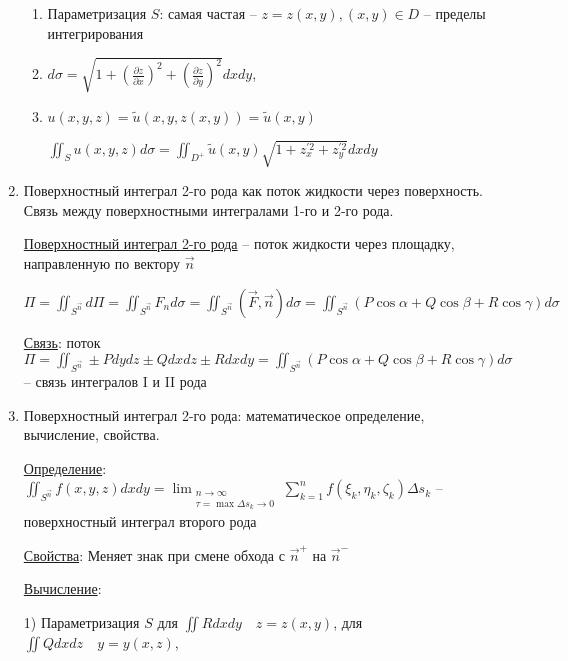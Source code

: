 \documentclass[12pt]{article}
\begin{document}
\begin{enumerate}
        \begin{enumerate}
            \item Параметризация $S$: самая частая -- $z = z(x, y), (x, y) \in D$ -- пределы интегрирования

            \item $d\sigma = \sqrt{1 + \left(\frac{\partial z}{\partial x}\right)^2 + \left(\frac{\partial z}{\partial y}\right)^2} dxdy$,

            \item $u(x, y, z) = \tilde{u}(x, y, z(x, y)) = \tilde{u}(x, y)$

            $\iint_S u(x, y, z) d\sigma = \iint_{D^+} \tilde{u}(x, y) \sqrt{1 + z_x^{\prime 2} + z_y^{\prime 2}} dxdy$
        \end{enumerate}


        \item Поверхностный интеграл 2-го рода как поток жидкости через поверхность. Связь между поверхностными интегралами 1-го и 2-го рода.

        \hyperlink{surfaceintegralofsecondkind}{Поверхностный интеграл 2-го рода} -- поток жидкости через площадку, направленную по вектору $\vec{n}$

        $\Pi = \iint_{S^{\vec{n}}} d\Pi = \iint_{S^{\vec{n}}} F_n d\sigma = \iint_{S^{\vec{n}}} (\vec{F}, \vec{n})d\sigma = \iint_{S^{\vec{n}}} (P\cos\alpha + Q\cos\beta + R\cos\gamma)d\sigma$

        \hyperlink{connectionbetweensurfaceintegral}{Связь}: поток $\Pi = \iint_{S^{\vec{n}}} \pm Pdydz \pm Qdxdz \pm Rdxdy = \iint_{S^{\vec{n}}} (P\cos\alpha + Q\cos\beta + R\cos\gamma) d\sigma$ -- связь интегралов I и II рода

        \item Поверхностный интеграл 2-го рода: математическое определение, вычисление, свойства.

        \hyperlink{surfaceintegralofsecondkindmath}{Определение}: $\iint_{S^{\vec{n}}} f(x, y, z) dxdy = \lim_{\substack{n \to \infty \\ \tau = \max \Delta s_k \to 0}} \sum_{k=1}^n f(\xi_k, \eta_k, \zeta_k) \Delta s_k$ -- поверхностный интеграл второго рода

        \hyperlink{surfaceintegralofsecondkindproperties}{Свойства}: Меняет знак при смене обхода с $\vec{n}^+$ на $\vec{n}^-$

        \hyperlink{surfaceintegralofsecondkindcalculation}{Вычисление}:

        1) Параметризация $S$ \quad для $\iint Rdxdy \quad z = z(x, y)$, для $\iint Qdxdz \quad y = y(x, z)$,


\end{enumerate}
\end{document}
